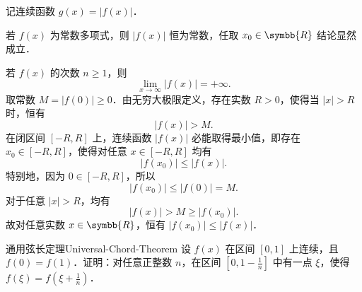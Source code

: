 \begin{myproof}
    记连续函数 $g(x) = |f(x)|$．

    若 $f(x)$ 为常数多项式，则 $|f(x)|$ 恒为常数，任取 $x_0 \in \symbb{R}$ 结论显然成立．

    若 $f(x)$ 的次数 $n \geqslant 1$，则
    \begin{equation}
        \lim_{x\to\infty} |f(x)| = +\infty.
    \end{equation}
    取常数 $M = |f(0)| \geqslant 0$．由无穷大极限定义，存在实数 $R > 0$，使得当 $|x| > R$ 时，恒有
    \begin{equation}
        |f(x)| > M.
    \end{equation}
    在闭区间 $[-R, R]$ 上，连续函数 $|f(x)|$ 必能取得最小值，即存在 $x_0 \in [-R, R]$，使得对任意 $x \in [-R, R]$ 均有
    \begin{equation}
        |f(x_0)| \leqslant |f(x)|.
    \end{equation}
    特别地，因为 $0 \in [-R, R]$，所以
    \begin{equation}
        |f(x_0)| \leqslant |f(0)| = M.
    \end{equation}
    对于任意 $|x| > R$，均有
    \begin{equation}
        |f(x)| > M \geqslant |f(x_0)|.
    \end{equation}
    故对任意实数 $x \in \symbb{R}$，恒有 $|f(x_0)| \leqslant |f(x)|$．
\end{myproof}

\begin{problem}{通用弦长定理}{Universal-Chord-Theorem}
    设 $f(x)$ 在区间 $[0, 1]$ 上连续，且 $f(0) = f(1)$．证明：对任意正整数 $n$，在区间 $\left[0, 1 - \frac{1}{n}\right]$ 中有一点 $\xi$，使得 $f(\xi) = f\left(\xi + \frac{1}{n}\right)$．
\end{problem}

